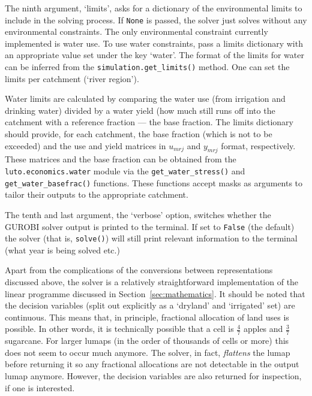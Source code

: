 \documentclass[12pt,a4paper,twoside]{article}
\begin{document}
The ninth argument, `limits', asks for a dictionary of the environmental limits to include in the solving process. If \texttt{None} is passed, the solver just solves without any environmental constraints. The only environmental constraint currently implemented is water use. To use water constraints, pass a limits dictionary with an appropriate value set under the key `water'. The format of the limits for water can be inferred from the \texttt{simulation.get_limits()} method. One can set the limits per catchment (`river region').

Water limits are calculated by comparing the water use (from irrigation and drinking water) divided by a water yield (how much still runs off into the catchment with a reference fraction --- the base fraction. The limits dictionary should provide, for each catchment, the base fraction (which is not to be exceeded) and the use and yield matrices in $u_{mrj}$ and $y_{mrj}$ format, respectively. These matrices and the base fraction can be obtained from the \texttt{luto.economics.water} module via the \texttt{get_water_stress()} and \texttt{get_water_basefrac()} functions. These functions accept masks as arguments to tailor their outputs to the appropriate catchment.

The tenth and last argument, the `verbose' option, switches whether the GUROBI solver output is printed to the terminal. If set to \texttt{False} (the default) the solver (that is, \texttt{solve()}) will still print relevant information to the terminal (what year is being solved etc.)

Apart from the complications of the conversions between representations discussed above, the solver is a relatively straightforward implementation of the linear programme discussed in Section~\ref{sec:mathematics}. It should be noted that the decision variables (split out explicitly as a `dryland' and `irrigated' set) are continuous. This means that, in principle, fractional allocation of land uses is possible. In other words, it is technically possible that a cell is $\frac{4}{7}$ apples and $\frac{3}{7}$ sugarcane. For larger lumaps (in the order of thousands of cells or more) this does not seem to occur much anymore. The solver, in fact, \emph{flattens} the lumap before returning it so any fractional allocations are not detectable in the output lumap anymore. However, the decision variables are also returned for inspection, if one is interested.
\end{document}
